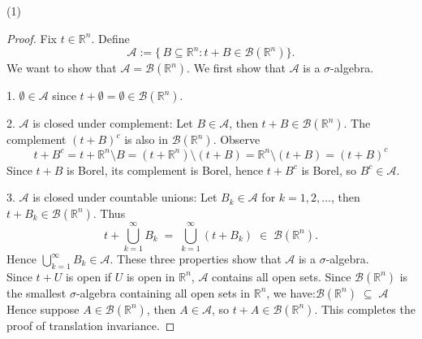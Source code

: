 \documentclass[lang=cn,11pt]{elegantbook}
\begin{document}
(1)
\begin{proof}

Fix \(t \in \mathbb{R}^n\). Define
\[
\mathcal{A} :=\{\, B \subseteq \mathbb{R}^n : t + B \in \mathcal{B}(\mathbb{R}^n) \}.
\]
We want to show that \(\mathcal{A} = \mathcal{B}(\mathbb{R}^n)\). We first show that $\mathcal{A}$ is a $\sigma$-algebra.

1. \(\emptyset     \in  \mathcal{A}\) since \(t + \emptyset = \emptyset \in \mathcal{B}(\mathbb{R}^n)\).

2. $\mathcal{A}$ is closed under complement: Let \(B \in \mathcal{A}\), then \(t + B \in \mathcal{B}(\mathbb{R}^n)\). The complement \((t + B)^c\) is also in \(\mathcal{B}(\mathbb{R}^n)\). Observe
\[
   t + B^c  = t + \mathbb{R}^n \setminus B = (t+\mathbb{R}^n) \setminus (t+B) = \mathbb{R}^n  \setminus (t+B) =  (t+B)^c
   \]
\noindent Since \(t + B\) is Borel, its complement is Borel, hence \(t + B^c\) is Borel, so \(B^c \in \mathcal{A}\).

3. $\mathcal{A}$ is closed under countable unions: Let \(B_k \in \mathcal{A}\) for \(k = 1, 2, \dots\), then \(t + B_k \in \mathcal{B}(\mathbb{R}^n)\). Thus
   \[
   t + \bigcup_{k=1}^{\infty} B_k
   \;=\;
   \bigcup_{k=1}^{\infty} (t + B_k)
   \;\in\;
   \mathcal{B}(\mathbb{R}^n).
   \]
\noindent Hence \(\bigcup_{k=1}^{\infty} B_k \in \mathcal{A}\).
\noindent These three properties show that \(\mathcal{A}\) is a \(\sigma\)-algebra. \\

\noindent Since \(t + U\) is open if \(U\) is open in $\mathbb{R}^n$, \(\mathcal{A}\) contains all open sets. Since \(\mathcal{B}(\mathbb{R}^n)\) is the smallest \(\sigma\)-algebra containing all open sets in \(\mathbb{R}^n\), we have:\(
\mathcal{B}(\mathbb{R}^n) \;\subseteq\; \mathcal{A}
\) 
\noindent Hence suppose \(A \in \mathcal{B}(\mathbb{R}^n) \), then $A \in \mathcal{A}$, so $t+A \in   \mathcal{B}(\mathbb{R}^n)$. This completes the proof of translation invariance.
\end{proof}
\end{document}
